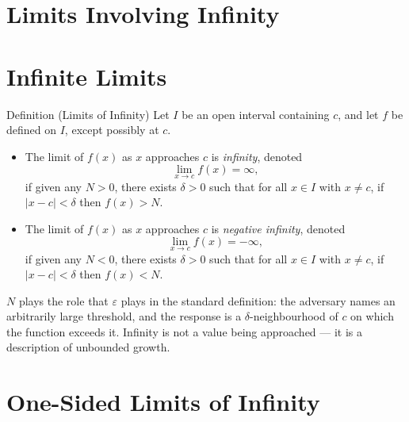 \section{Limits Involving Infinity}

\section*{Infinite Limits}

\begin{propositionbox}{Definition (Limits of Infinity)}
Let $I$ be an open interval containing $c$, and let $f$ be defined
on $I$, except possibly at $c$.
\begin{itemize}
  \item The limit of $f(x)$ as $x$ approaches $c$ is \emph{infinity},
        denoted
        \[
          \lim_{x \to c} f(x) = \infty,
        \]
        if given any $N > 0$, there exists $\delta > 0$ such that
        for all $x \in I$ with $x \neq c$, if $|x - c| < \delta$
        then $f(x) > N$.

  \item The limit of $f(x)$ as $x$ approaches $c$ is
        \emph{negative infinity}, denoted
        \[
          \lim_{x \to c} f(x) = -\infty,
        \]
        if given any $N < 0$, there exists $\delta > 0$ such that
        for all $x \in I$ with $x \neq c$, if $|x - c| < \delta$
        then $f(x) < N$.
\end{itemize}
\end{propositionbox}

\begin{remark*}[Intuition]
$N$ plays the role that $\varepsilon$ plays in the standard
definition: the adversary names an arbitrarily large threshold,
and the response is a $\delta$-neighbourhood of $c$ on which the
function exceeds it.
Infinity is not a value being approached --- it is a description
of unbounded growth.
\end{remark*}

\section*{One-Sided Limits of Infinity}

